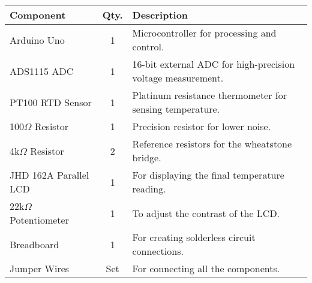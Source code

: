 \begin{tabular}{|l|c|p{4cm}|}
    \hline
    \textbf{Component} & \textbf{Qty.} & \textbf{Description} \\
    \hline
    Arduino Uno & 1 & Microcontroller for processing and control. \\
    \hline
    ADS1115 ADC & 1 & 16-bit external ADC for high-precision voltage measurement. \\
    \hline
    PT100 RTD Sensor & 1 & Platinum resistance thermometer for sensing temperature. \\
    \hline
    100$\Omega$ Resistor & 1 & Precision resistor for lower noise. \\
    \hline
    4k$\Omega$ Resistor & 2 & Reference resistors for the wheatstone bridge. \\
    \hline
    JHD 162A Parallel LCD & 1 & For displaying the final temperature reading. \\
    \hline
    22k$\Omega$ Potentiometer & 1 & To adjust the contrast of the LCD. \\
    \hline
    Breadboard & 1 & For creating solderless circuit connections. \\
    \hline
    Jumper Wires & Set & For connecting all the components. \\
    \hline
\end{tabular}
